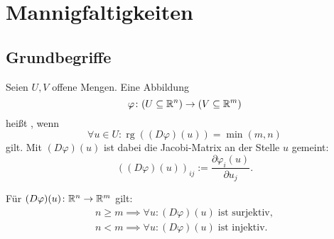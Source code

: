 \section{Mannigfaltigkeiten}
\subsection{Grundbegriffe}
\begin{Definition}
Seien $U,V$ offene Mengen. Eine Abbildung
\begin{equation}
\varphi\colon (U\subseteq\mathbb R^n)\to (V\subseteq\mathbb R^m)
\end{equation}
heißt , wenn
\begin{equation}
\forall u\in U\colon \operatorname{rg}((D\varphi)(u))=\min(m,n)
\end{equation}
gilt. Mit $(D\varphi)(u)$ ist dabei die Jacobi-Matrix an der Stelle
$u$ gemeint:
\begin{equation}
((D\varphi)(u))_{ij} := \frac{\partial\varphi_i(u)}{\partial u_j}.
\end{equation}
\end{Definition}
\noindent
Für $(D\varphi)(u)\colon\mathbb R^n\to\mathbb R^m$ gilt:
\begin{gather}
n{\ge}m\implies\forall u\colon (D\varphi)(u)\;\text{ist surjektiv},\\
n{<}m\implies\forall u\colon (D\varphi)(u)\;\text{ist injektiv}.
\end{gather}

